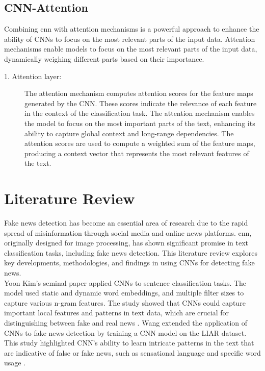 \subsection{CNN-Attention}

Combining \ac{cnn} with attention mechanisms is a powerful approach to enhance the ability of CNNs to focus on the most relevant parts of the input data. Attention mechanisms enable models to focus on the most relevant parts of the input data, dynamically weighing different parts based on their importance.

\begin{description}

    \item[1. Attention layer:] The attention mechanism computes attention scores for the feature maps generated by the CNN. These scores indicate the relevance of each feature in the context of the classification task. The attention mechanism enables the model to focus on the most important parts of the text, enhancing its ability to capture global context and long-range dependencies. The attention scores are used to compute a weighted sum of the feature maps, producing a context vector that represents the most relevant features of the text.
    
\end{description}

\section{Literature Review}

Fake news detection has become an essential area of research due to the rapid spread of misinformation through social media and online news platforms. \ac{cnn}, originally designed for image processing, has shown significant promise in text classification tasks, including fake news detection. This literature review explores key developments, methodologies, and findings in using CNNs for detecting fake news.\\

Yoon Kim's seminal paper applied CNNs to sentence classification tasks. The model used static and dynamic word embeddings, and multiple filter sizes to capture various n-gram features. The study showed that CNNs could capture important local features and patterns in text data, which are crucial for distinguishing between fake and real news \cite{kim2014convolutional}. Wang extended the application of CNNs to fake news detection by training a CNN model on the LIAR dataset. This study highlighted CNN's ability to learn intricate patterns in the text that are indicative of false or fake news, such as sensational language and specific word usage \cite{wang-2017-liar}. \\

